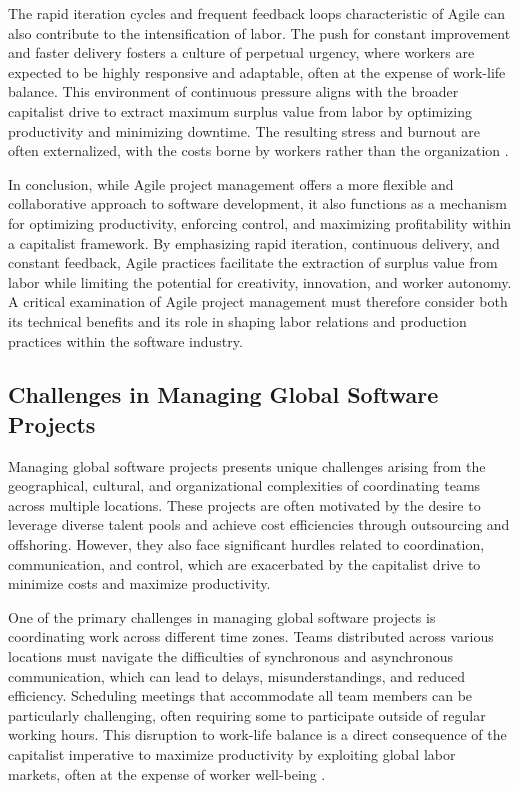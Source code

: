 \begin{refsection}
The rapid iteration cycles and frequent feedback loops characteristic of Agile can also contribute to the intensification of labor. The push for constant improvement and faster delivery fosters a culture of perpetual urgency, where workers are expected to be highly responsive and adaptable, often at the expense of work-life balance. This environment of continuous pressure aligns with the broader capitalist drive to extract maximum surplus value from labor by optimizing productivity and minimizing downtime. The resulting stress and burnout are often externalized, with the costs borne by workers rather than the organization \cite[pp.~188-190]{Beck2021ExtremeProgramming}.

In conclusion, while Agile project management offers a more flexible and collaborative approach to software development, it also functions as a mechanism for optimizing productivity, enforcing control, and maximizing profitability within a capitalist framework. By emphasizing rapid iteration, continuous delivery, and constant feedback, Agile practices facilitate the extraction of surplus value from labor while limiting the potential for creativity, innovation, and worker autonomy. A critical examination of Agile project management must therefore consider both its technical benefits and its role in shaping labor relations and production practices within the software industry.

\subsection{Challenges in Managing Global Software Projects}

Managing global software projects presents unique challenges arising from the geographical, cultural, and organizational complexities of coordinating teams across multiple locations. These projects are often motivated by the desire to leverage diverse talent pools and achieve cost efficiencies through outsourcing and offshoring. However, they also face significant hurdles related to coordination, communication, and control, which are exacerbated by the capitalist drive to minimize costs and maximize productivity.

One of the primary challenges in managing global software projects is coordinating work across different time zones. Teams distributed across various locations must navigate the difficulties of synchronous and asynchronous communication, which can lead to delays, misunderstandings, and reduced efficiency. Scheduling meetings that accommodate all team members can be particularly challenging, often requiring some to participate outside of regular working hours. This disruption to work-life balance is a direct consequence of the capitalist imperative to maximize productivity by exploiting global labor markets, often at the expense of worker well-being \cite[pp.~78-81]{Herbsleb2001EmpiricalStudy}.


\end{refsection}
